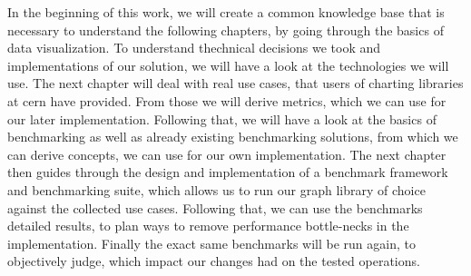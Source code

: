 
In the beginning of this work, we will create a common knowledge base that is necessary to understand the following chapters, by going through the basics of data visualization. To understand thechnical decisions we took and implementations of our solution, we will have a look at the technologies we will use.
The next chapter will deal with real use cases, that users of charting libraries at \gls{cern} have provided. From those we will derive metrics, which we can use for our later implementation.
Following that, we will have a look at the basics of benchmarking as well as already existing benchmarking solutions, from which we can derive concepts, we can use for our own implementation.
The next chapter then guides through the design and implementation of a benchmark framework and benchmarking suite, which allows us to run our graph library of choice against the collected use cases. Following that, we can use the benchmarks detailed results, to plan ways to remove performance bottle-necks in the implementation. Finally the exact same benchmarks will be run again, to objectively judge, which impact our changes had on the tested operations.
